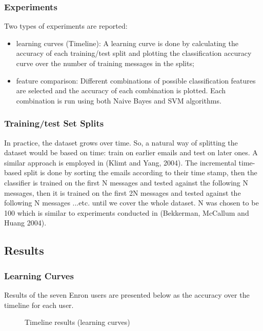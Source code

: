 \subsubsection{Experiments}
Two types of experiments are reported:

\begin{itemize}
  \item learning curves (Timeline): A learning curve is done by calculating the 
  accuracy of each training/test split and plotting the classification accuracy 
  curve over the number of training messages in the splits;

  \item feature comparison: Different combinations of possible classification 
  features are selected and the accuracy of each combination is plotted. 
  Each combination is run using both Naive Bayes and SVM algorithms.
  \end{itemize}

\subsubsection{Training/test Set Splits}
In practice, the dataset grows over time. So, a natural way of splitting the 
dataset would be based on time: train on earlier emails and test on later 
ones. A similar approach is employed in (Klimt and Yang, 2004)\cite{KY04}. 
The incremental time-based split is done by sorting the emails according to 
their time stamp, then the classifier is trained on the first N messages and 
tested against the following N messages, then it is trained on the first 2N 
messages and tested against the following N messages ...etc. until we cover 
the whole dataset. N was chosen to be 100 which is similar to experiments 
conducted in (Bekkerman, McCallum and Huang 2004)\cite{RON04}.

\subsection{Results}

\subsubsection{Learning Curves}
Results of the seven Enron users are presented below as the accuracy over 
the timeline for each user.

\begin{figure}[H]
    \begin{center}
    \end{center}
    \caption{Timeline results (learning curves)}
\end{figure}

